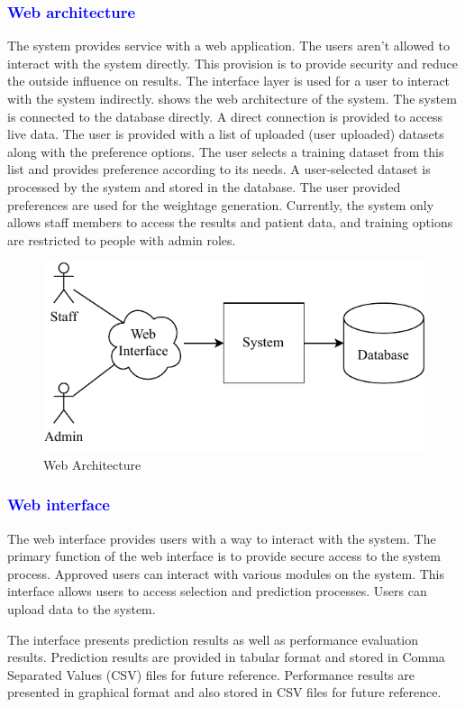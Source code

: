 \documentclass[a4paper,fleqn]{cas-dc}
\newcommand{\responsemodsm}[1]{\textcolor{blue}{#1}}
\newcommand{\subsubsectionb}[1]{\subsubsection{\responsemodsm{#1}}}
\begin{document}
\subsubsectionb{Web architecture}\label{subsubsec:web_architecture}

The system provides service with a web application. The users aren't allowed to interact with the system directly. This provision is to provide security and reduce the outside influence on results. The interface layer is used for a user to interact with the system indirectly.  shows the web architecture of the system. The system is connected to the database directly. A direct connection is provided to access live data. The user is provided with a list of uploaded (user uploaded) datasets along with the preference options. The user selects a training dataset from this list and provides preference according to its needs. A user-selected dataset is processed by the system and stored in the database. The user provided preferences are used for the weightage generation. Currently, the system only allows staff members to access the results and patient data, and training options are restricted to people with admin roles.

\begin{figure}[ht]
    \centering
    \includegraphics[width=0.9\columnwidth]{web_architecture.pdf}
    \caption{Web Architecture}
    \label{fig:web_architecture}
\end{figure}

\subsubsectionb{Web interface}\label{subsubsec:web_interface}

The web interface provides users with a way to interact with the system. The primary function of the web interface is to provide secure access to the system process. Approved users can interact with various modules on the system. This interface allows users to access selection and prediction processes. Users can upload data to the system.

The interface presents prediction results as well as performance evaluation results. Prediction results are provided in tabular format and stored in Comma Separated Values (CSV) files for future reference. Performance results are presented in graphical format and also stored in CSV files for future reference.
\end{document}
